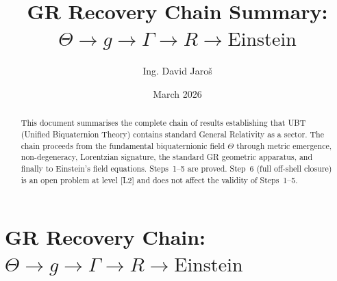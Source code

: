\documentclass[12pt]{article}
\title{\textbf{GR Recovery Chain Summary:\\
         $\Theta \to g \to \Gamma \to R \to \text{Einstein}$}}
\author{Ing. David Jaroš}
\date{March 2026}
\theoremstyle{definition}
\theoremstyle{remark}
\begin{document}
  \maketitle

  \begin{abstract}
  This document summarises the complete chain of results establishing that
  UBT (Unified Biquaternion Theory) contains standard General Relativity
  as a sector.  The chain proceeds from the fundamental biquaternionic field
  $\Theta$ through metric emergence, non-degeneracy, Lorentzian signature,
  the standard GR geometric apparatus, and finally to Einstein's field
  equations.  Steps~1--5 are proved.  Step~6 (full off-shell closure) is an
  open problem at level [L2] and does not affect the validity of Steps~1--5.
  \end{abstract}
\fi

\section{GR Recovery Chain: $\Theta \to g \to \Gamma \to R \to \text{Einstein}$}
\label{sec:gr_chain_summary}
\end{document}
